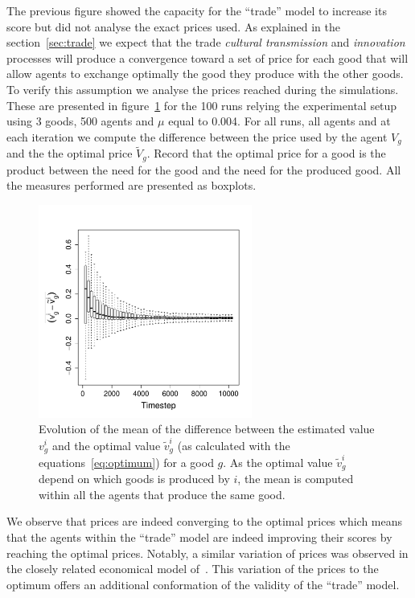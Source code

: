 \documentclass{wscpaperproc}
\begin{document}
The previous figure showed the capacity for the ``trade'' model to increase its score but did not analyse the exact prices used. As explained in the section~\ref{sec:trade} we expect that the trade \emph{cultural transmission} and \emph{innovation} processes will produce a convergence toward a set of price for each good that will allow agents to exchange optimally the good they produce with the other goods. To verify this assumption we analyse the prices reached during the simulations. These are presented in figure~\ref{fig:ratioEvol} for the 100 runs relying the experimental setup using 3 goods, 500 agents and $\mu$ equal to 0.004. For all runs, all agents and at each iteration we compute the difference between the price used by the agent $V_g$ and the the optimal price $\tilde{V}_g$. Record that the optimal price for a good is the product between the need for the good and the need for the produced good. All the measures performed are presented as boxplots.

\begin{figure}[H]
	\begin{center}
		\includegraphics[width=7cm]{img/ClearingPriceDistanceEvolutionForTrade-G3N500.pdf}
	\end{center}
	\caption{Evolution of the mean of the difference between the estimated value $v^i_g$ and the optimal value $\tilde{v}^i_g$ (as calculated with the equations~\ref{eq:optimum}) for a good $g$. As the optimal value $\tilde{v}^i_g$ depend on which goods is produced by $i$, the mean is computed within all the agents that produce the same good. }
	\label{fig:ratioEvol}
\end{figure}

We observe that prices are indeed converging to the optimal prices which means that the agents within the ``trade'' model are indeed improving their scores by reaching the optimal prices. Notably, a similar variation of prices was observed in the closely related economical model of~\cite{gintis_emergence_2006}. This variation of the prices to the optimum offers an additional conformation of the validity of the ``trade'' model. 
\end{document}
